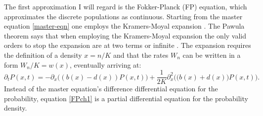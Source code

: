 The first approximation I will regard is the Fokker-Planck (FP) equation, which approximates the discrete populations as continuous. 
Starting from the master equation \ref{master-eqn} one employs the Kramers-Moyal expansion \cite{Gardiner2004}. 
The Pawula theorem says that when employing the Kramers-Moyal expansion the only valid orders to stop the expansion are at two terms or infinite \cite{VanKampen1992}. 
The expansion requires the definition of a density $x=n/K$ and that the rates $W_n$ can be written in a form $W_n/K = w(x)$, eventually arriving at:
\begin{equation}
\partial_t P(x,t) = - \partial_x\Big( (b(x) - d(x)) P(x,t) \Big) + \frac{1}{2 K} \partial_x^2 \Big( \big(b(x) + d(x)\big) P(x,t) \Big). 
 \label{FPch1}
\end{equation}
Instead of the master equation's difference differential equation for the probability, equation \ref{FPch1} is a partial differential equation for the probability density. %
